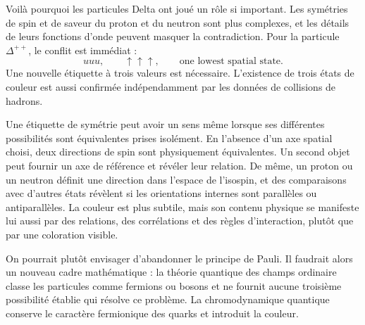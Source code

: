 
\begin{classroomqa}
\end{classroomqa}

Voilà pourquoi les particules Delta ont joué un rôle si important. Les symétries de spin et de saveur du proton et du neutron sont plus complexes, et les détails de leurs fonctions d’onde peuvent masquer la contradiction. Pour la particule \(\Delta^{++}\), le conflit est immédiat :
\begin{equation}
uuu,\qquad
\uparrow\uparrow\uparrow,
\qquad
\text{one lowest spatial state}.
\end{equation}
Une nouvelle étiquette à trois valeurs est nécessaire. L’existence de trois états de couleur est aussi confirmée indépendamment par les données de collisions de hadrons.

Une étiquette de symétrie peut avoir un sens même lorsque ses différentes possibilités sont équivalentes prises isolément. En l’absence d’un axe spatial choisi, deux directions de spin sont physiquement équivalentes. Un second objet peut fournir un axe de référence et révéler leur relation. De même, un proton ou un neutron définit une direction dans l’espace de l’isospin, et des comparaisons avec d’autres états révèlent si les orientations internes sont parallèles ou antiparallèles. La couleur est plus subtile, mais son contenu physique se manifeste lui aussi par des relations, des corrélations et des règles d’interaction, plutôt que par une coloration visible.

On pourrait plutôt envisager d’abandonner le principe de Pauli. Il faudrait alors un nouveau cadre mathématique : la théorie quantique des champs ordinaire classe les particules comme fermions ou bosons et ne fournit aucune troisième possibilité établie qui résolve ce problème. La chromodynamique quantique conserve le caractère fermionique des quarks et introduit la couleur.

